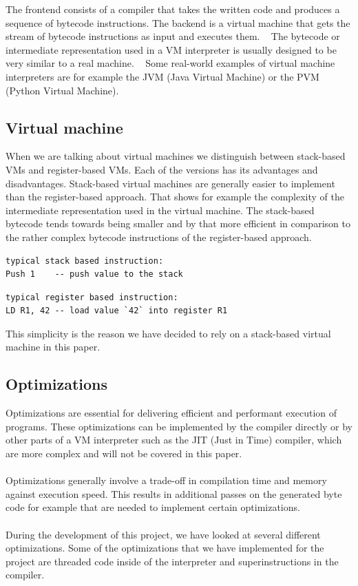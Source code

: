 \documentclass{article}
\begin{document}
The frontend consists of a compiler that takes the written code and produces a
sequence of bytecode instructions. The backend is a virtual machine that gets
the stream of bytecode instructions as input and executes them. ~\cite{vmgen}
The bytecode or intermediate representation used in a VM interpreter is usually
designed to be very similar to a real machine. ~\cite{vmgen} Some real-world
examples of virtual machine interpreters are for example the JVM (Java Virtual
Machine) or the PVM (Python Virtual Machine).
\\
\subsection{Virtual machine}
When we are talking about virtual machines we distinguish between stack-based
VMs and register-based VMs. Each of the versions has its advantages and
disadvantages. Stack-based virtual machines are generally easier to implement
than the register-based approach. That shows for example the complexity of the
intermediate representation used in the virtual machine. The stack-based
bytecode tends towards being smaller and by that more efficient in comparison
to the rather complex bytecode instructions of the register-based approach.

\begin{verbatim}
typical stack based instruction:
Push 1    -- push value to the stack
\end{verbatim}

\begin{verbatim}
typical register based instruction:
LD R1, 42 -- load value `42` into register R1
\end{verbatim}

This simplicity is the reason we have decided to rely on a stack-based virtual machine in
this paper.

\subsection{Optimizations}
Optimizations are essential for delivering efficient and performant execution of
programs. These optimizations can be implemented by the compiler directly or
by other parts of a VM interpreter such as the JIT (Just in Time) compiler, which
are more complex and will not be covered in this paper.
\\ \\
Optimizations generally involve a trade-off in compilation time and memory
against execution speed. This results in additional passes on the generated
byte code for example that are needed to implement certain optimizations.
\\ \\
During the development of this project, we have looked at several different
optimizations. Some of the optimizations that we have implemented for the
project are threaded code inside of the interpreter and superinstructions in
the compiler.
\end{document}

